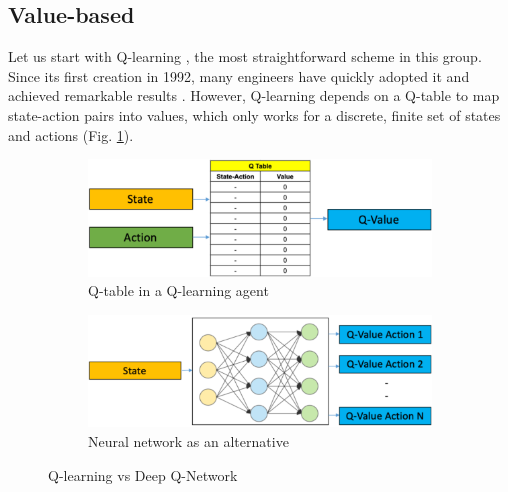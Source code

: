 \documentclass[../main.tex]{subfiles}
\begin{document}
\subsection{Value-based}
Let us start with Q-learning \cite{watkins1992qlearning}, the most straightforward scheme in this group. Since its first creation in 1992, many engineers have quickly adopted it and achieved remarkable results \citep{ISSN0360-5442, chen2019gnu, cho2006application, li2015multi}. However, Q-learning depends on a Q-table to map state-action pairs into values, which only works for a discrete, finite set of states and actions (Fig. \ref{fig:qtable}).
\begin{figure}
    \centering
    \begin{subfigure}[t]{0.75\textwidth}
        \centering
        \includegraphics[width=\linewidth]{figures/qtable.png}
        \caption{Q-table in a Q-learning agent}
        \label{fig:qtable}
    \end{subfigure}
    \begin{subfigure}[t]{0.75\textwidth}
        \centering
        \includegraphics[width=\linewidth]{figures/dqn.png}
        \caption{Neural network as an alternative}
        \label{fig:dqn}
    \end{subfigure}
\caption{Q-learning vs Deep Q-Network}
\end{figure}
\end{document}

